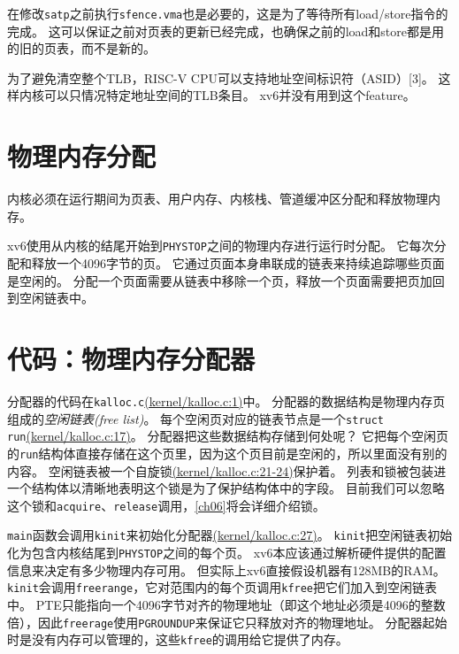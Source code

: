 在修改\texttt{satp}之前执行\texttt{sfence.vma}也是必要的，这是为了等待所有load/store指令的完成。
这可以保证之前对页表的更新已经完成，也确保之前的load和store都是用的旧的页表，而不是新的。

为了避免清空整个TLB，RISC-V CPU可以支持地址空间标识符（ASID）[3]。
这样内核可以只情况特定地址空间的TLB条目。
xv6并没有用到这个feature。

\section{物理内存分配}
内核必须在运行期间为页表、用户内存、内核栈、管道缓冲区分配和释放物理内存。

xv6使用从内核的结尾开始到\texttt{PHYSTOP}之间的物理内存进行运行时分配。
它每次分配和释放一个4096字节的页。
它通过页面本身串联成的链表来持续追踪哪些页面是空闲的。
分配一个页面需要从链表中移除一个页，释放一个页面需要把页加回到空闲链表中。

\section{代码：物理内存分配器}
分配器的代码在\texttt{kalloc.c}\href{https://github.com/mit-pdos/xv6-riscv/blob/riscv/kernel/kalloc.c#L1}{(kernel/kalloc.c:1)}中。
分配器的数据结构是物理内存页组成的\emph{空闲链表(free list)}。
每个空闲页对应的链表节点是一个\texttt{struct run}\href{https://github.com/mit-pdos/xv6-riscv/blob/riscv/kernel/kalloc.c#L17}{(kernel/kalloc.c:17)}。
分配器把这些数据结构存储到何处呢？
它把每个空闲页的\texttt{run}结构体直接存储在这个页里，因为这个页目前是空闲的，所以里面没有别的内容。
空闲链表被一个自旋锁\href{https://github.com/mit-pdos/xv6-riscv/blob/riscv/kernel/kalloc.c#L21-L24}{(kernel/kalloc.c:21-24)}保护着。
列表和锁被包装进一个结构体以清晰地表明这个锁是为了保护结构体中的字段。
目前我们可以忽略这个锁和\texttt{acquire}、\texttt{release}调用，\autoref{ch06}将会详细介绍锁。

\texttt{main}函数会调用\texttt{kinit}来初始化分配器\href{https://github.com/mit-pdos/xv6-riscv/blob/riscv/kernel/kalloc.c#L27}{(kernel/kalloc.c:27)}。
\texttt{kinit}把空闲链表初始化为包含内核结尾到\texttt{PHYSTOP}之间的每个页。
xv6本应该通过解析硬件提供的配置信息来决定有多少物理内存可用。
但实际上xv6直接假设机器有128MB的RAM。
\texttt{kinit}会调用\texttt{freerange}，它对范围内的每个页调用\texttt{kfree}把它们加入到空闲链表中。
PTE只能指向一个4096字节对齐的物理地址（即这个地址必须是4096的整数倍），因此\texttt{freerage}使用\texttt{PGROUNDUP}来保证它只释放对齐的物理地址。
分配器起始时是没有内存可以管理的，这些\texttt{kfree}的调用给它提供了内存。

